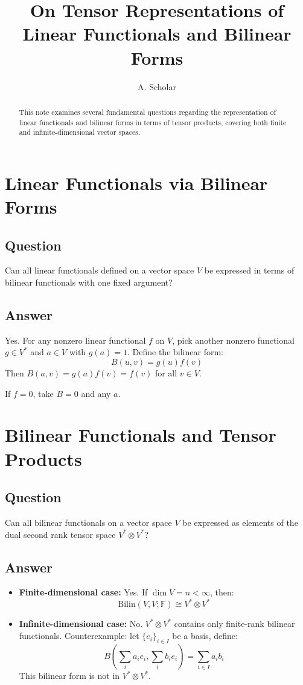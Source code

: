 \documentclass[aps,prl,reprint]{revtex4-2}
\begin{document}
\title{On Tensor Representations of Linear Functionals and Bilinear Forms}
\author{A. Scholar}

\begin{abstract}
This note examines several fundamental questions regarding the representation of linear functionals and bilinear forms in terms of tensor products, covering both finite and infinite-dimensional vector spaces.
\end{abstract}

\maketitle

\section{Linear Functionals via Bilinear Forms}

\subsection{Question}
Can all linear functionals defined on a vector space $V$ be expressed in terms of bilinear functionals with one fixed argument?

\subsection{Answer}
Yes. For any nonzero linear functional $f$ on $V$, pick another nonzero functional $g \in V^*$ and $a \in V$ with $g(a) = 1$. Define the bilinear form:
\[
B(u, v) = g(u)f(v)
\]
Then $B(a, v) = g(a)f(v) = f(v)$ for all $v \in V$.

If $f = 0$, take $B = 0$ and any $a$.

\section{Bilinear Functionals and Tensor Products}

\subsection{Question}
Can all bilinear functionals on a vector space $V$ be expressed as elements of the dual second rank tensor space $V^* \otimes V^*$?

\subsection{Answer}
\begin{itemize}
\item \textbf{Finite-dimensional case:} Yes. If $\dim V = n < \infty$, then:
\[
\text{Bilin}(V, V; \mathbb{F}) \cong V^* \otimes V^*
\]
\item \textbf{Infinite-dimensional case:} No. $V^* \otimes V^*$ contains only finite-rank bilinear functionals. Counterexample: let $\{e_i\}_{i \in I}$ be a basis, define:
\[
B\left(\sum_i a_i e_i, \sum_i b_i e_i\right) = \sum_{i \in I} a_i b_i
\]
This bilinear form is not in $V^* \otimes V^*$.
\end{itemize}
\end{document}
